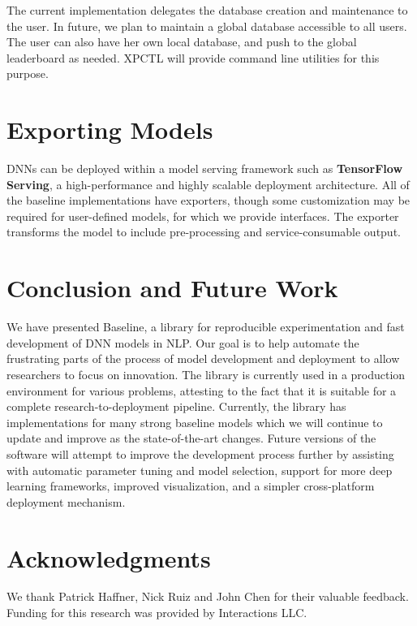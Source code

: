\documentclass[11pt,a4paper]{article}
\begin{document}
The current implementation delegates the database creation and maintenance to the user. In future, we plan to maintain a global database accessible to all users. The user can also have her own local database, and push to the global leaderboard as needed. XPCTL will provide command line utilities for this purpose.

\section{Exporting Models}
\label{sec:export}

DNNs can be deployed within a model serving framework such as \textbf{TensorFlow Serving}, a high-performance and highly scalable deployment architecture. All of the baseline implementations have exporters, though some customization may be required for user-defined models, for which we provide interfaces. The exporter transforms the model to include pre-processing and service-consumable output.

\section{Conclusion and Future Work}
We have presented Baseline, a library for reproducible experimentation and fast development of DNN models in NLP. Our goal is to help automate the frustrating parts of the process of model development and deployment to allow researchers to focus on innovation. The library is currently used in a production environment for various problems, attesting to the fact that it is suitable for a complete research-to-deployment pipeline. Currently, the library has implementations for many strong baseline models which we will continue to update and improve as the state-of-the-art changes. Future versions of the software will attempt to improve the development process further by assisting with automatic parameter tuning and model selection, support for more deep learning frameworks, improved visualization, and a simpler cross-platform deployment mechanism. 
 
\section*{Acknowledgments}
We thank Patrick Haffner, Nick Ruiz and John Chen for their valuable feedback. Funding for this research was provided by Interactions LLC. 



\end{document}
